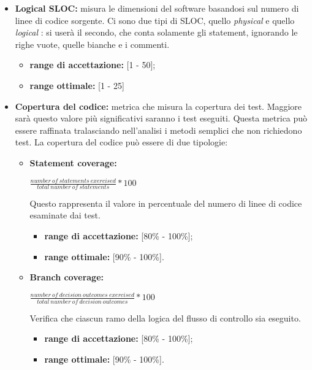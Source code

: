 \begin{itemize}
				\item \textbf{Logical SLOC:} misura le dimensioni del software basandosi sul numero di linee di codice sorgente. Ci sono due tipi di SLOC, quello \textit{physical} e quello \textit{logical} : si userà il secondo, che conta solamente gli statement, ignorando le righe vuote, quelle bianche e i commenti.
				\begin{itemize}
					\item \textbf{range di accettazione:} [1 - 50]; 
					\item \textbf{range ottimale:} [1 - 25]
				\end{itemize}
								
				\item \textbf{Copertura del codice:} metrica che misura la copertura dei test. Maggiore sarà questo valore più significativi saranno i test eseguiti. Questa metrica può essere raffinata tralasciando nell'analisi i metodi semplici che non richiedono test. La copertura del codice può essere di due tipologie:
				\begin{itemize}
					\item \textbf{Statement coverage:}\\
					\begin{center}
						\begin{math}
							\frac{number\ of\ statements\ exercised} {total\ number\ of\ statements} * 100
						\end{math}
					\end{center}
					Questo rappresenta il valore in percentuale del numero di linee di codice esaminate dai test.
					\begin{itemize}
						\item \textbf{range di accettazione:} [80\% - 100\%];
						\item \textbf{range ottimale:} [90\% - 100\%].
					\end{itemize}
					\item \textbf{Branch coverage:}\\
					\begin{center}
						\begin{math}
							\frac{number\ of\ decision\ outcomes\ exercised}{total\ number\ of\ decision\ outcomes} * 100
						\end{math}
					\end{center}
					Verifica che ciascun ramo della logica del flusso di controllo sia eseguito.
					\begin{itemize}
						\item \textbf{range di accettazione:} [80\% - 100\%];
						\item \textbf{range ottimale:} [90\% - 100\%].
					\end{itemize}		
				\end{itemize}					
				

\end{itemize}
